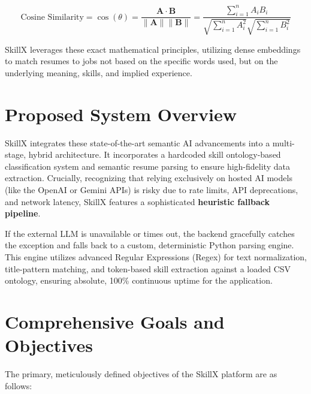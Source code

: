 \documentclass[12pt,a4paper]{report}
\begin{document}
\begin{equation}
\text{Cosine Similarity} = \cos(\theta) = \frac{\mathbf{A} \cdot \mathbf{B}}{\|\mathbf{A}\| \|\mathbf{B}\|} = \frac{\sum_{i=1}^{n} A_i B_i}{\sqrt{\sum_{i=1}^{n} A_i^2} \sqrt{\sum_{i=1}^{n} B_i^2}}
\end{equation}

SkillX leverages these exact mathematical principles, utilizing dense embeddings to match resumes to jobs not based on the specific words used, but on the underlying meaning, skills, and implied experience.

\section{Proposed System Overview}

SkillX integrates these state-of-the-art semantic AI advancements into a multi-stage, hybrid architecture. It incorporates a hardcoded skill ontology-based classification system and semantic resume parsing to ensure high-fidelity data extraction. Crucially, recognizing that relying exclusively on hosted AI models (like the OpenAI or Gemini APIs) is risky due to rate limits, API deprecations, and network latency, SkillX features a sophisticated \textbf{heuristic fallback pipeline}. 

If the external LLM is unavailable or times out, the backend gracefully catches the exception and falls back to a custom, deterministic Python parsing engine. This engine utilizes advanced Regular Expressions (Regex) for text normalization, title-pattern matching, and token-based skill extraction against a loaded CSV ontology, ensuring absolute, 100\% continuous uptime for the application. 

\section{Comprehensive Goals and Objectives}

The primary, meticulously defined objectives of the SkillX platform are as follows:
\end{document}

